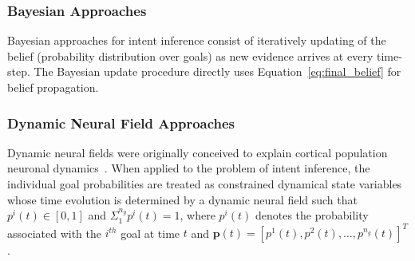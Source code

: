 \documentclass[conference]{IEEEtran}
\begin{document}
\subsubsection{Bayesian Approaches}
Bayesian approaches for intent inference consist of iteratively updating of the belief (probability distribution over goals) as new evidence arrives at every time-step. The Bayesian update procedure directly uses Equation~\ref{eq:final_belief} for belief propagation. 


\subsubsection{Dynamic Neural Field Approaches}
Dynamic neural fields were originally conceived to explain cortical population neuronal dynamics~\citep{schoner2008dynamical}. 
When applied to the problem of intent inference, the individual goal probabilities are treated as constrained dynamical state variables whose time evolution is determined by a dynamic neural field such that $p^i(t) \in [0, 1]$ and $\Sigma_{1}^{n_g}p^{i}(t) = 1$, where $p^i(t)$ denotes the probability associated with the $i^{th}$ goal at time $t$ and $\boldsymbol{p}(t) = [p^1(t), p^2(t),\dots,p^{n_g}(t) ]^{T}$. 
\end{document}
